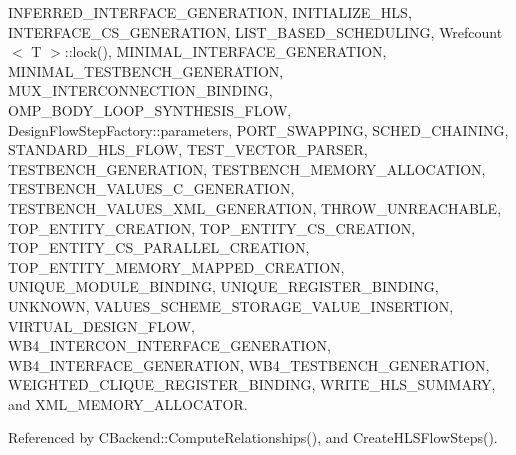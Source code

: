 I\+N\+F\+E\+R\+R\+E\+D\+\_\+\+I\+N\+T\+E\+R\+F\+A\+C\+E\+\_\+\+G\+E\+N\+E\+R\+A\+T\+I\+ON, I\+N\+I\+T\+I\+A\+L\+I\+Z\+E\+\_\+\+H\+LS, I\+N\+T\+E\+R\+F\+A\+C\+E\+\_\+\+C\+S\+\_\+\+G\+E\+N\+E\+R\+A\+T\+I\+ON, L\+I\+S\+T\+\_\+\+B\+A\+S\+E\+D\+\_\+\+S\+C\+H\+E\+D\+U\+L\+I\+NG, Wrefcount$<$ T $>$\+::lock(), M\+I\+N\+I\+M\+A\+L\+\_\+\+I\+N\+T\+E\+R\+F\+A\+C\+E\+\_\+\+G\+E\+N\+E\+R\+A\+T\+I\+ON, M\+I\+N\+I\+M\+A\+L\+\_\+\+T\+E\+S\+T\+B\+E\+N\+C\+H\+\_\+\+G\+E\+N\+E\+R\+A\+T\+I\+ON, M\+U\+X\+\_\+\+I\+N\+T\+E\+R\+C\+O\+N\+N\+E\+C\+T\+I\+O\+N\+\_\+\+B\+I\+N\+D\+I\+NG, O\+M\+P\+\_\+\+B\+O\+D\+Y\+\_\+\+L\+O\+O\+P\+\_\+\+S\+Y\+N\+T\+H\+E\+S\+I\+S\+\_\+\+F\+L\+OW, Design\+Flow\+Step\+Factory\+::parameters, P\+O\+R\+T\+\_\+\+S\+W\+A\+P\+P\+I\+NG, S\+C\+H\+E\+D\+\_\+\+C\+H\+A\+I\+N\+I\+NG, S\+T\+A\+N\+D\+A\+R\+D\+\_\+\+H\+L\+S\+\_\+\+F\+L\+OW, T\+E\+S\+T\+\_\+\+V\+E\+C\+T\+O\+R\+\_\+\+P\+A\+R\+S\+ER, T\+E\+S\+T\+B\+E\+N\+C\+H\+\_\+\+G\+E\+N\+E\+R\+A\+T\+I\+ON, T\+E\+S\+T\+B\+E\+N\+C\+H\+\_\+\+M\+E\+M\+O\+R\+Y\+\_\+\+A\+L\+L\+O\+C\+A\+T\+I\+ON, T\+E\+S\+T\+B\+E\+N\+C\+H\+\_\+\+V\+A\+L\+U\+E\+S\+\_\+\+C\+\_\+\+G\+E\+N\+E\+R\+A\+T\+I\+ON, T\+E\+S\+T\+B\+E\+N\+C\+H\+\_\+\+V\+A\+L\+U\+E\+S\+\_\+\+X\+M\+L\+\_\+\+G\+E\+N\+E\+R\+A\+T\+I\+ON, T\+H\+R\+O\+W\+\_\+\+U\+N\+R\+E\+A\+C\+H\+A\+B\+LE, T\+O\+P\+\_\+\+E\+N\+T\+I\+T\+Y\+\_\+\+C\+R\+E\+A\+T\+I\+ON, T\+O\+P\+\_\+\+E\+N\+T\+I\+T\+Y\+\_\+\+C\+S\+\_\+\+C\+R\+E\+A\+T\+I\+ON, T\+O\+P\+\_\+\+E\+N\+T\+I\+T\+Y\+\_\+\+C\+S\+\_\+\+P\+A\+R\+A\+L\+L\+E\+L\+\_\+\+C\+R\+E\+A\+T\+I\+ON, T\+O\+P\+\_\+\+E\+N\+T\+I\+T\+Y\+\_\+\+M\+E\+M\+O\+R\+Y\+\_\+\+M\+A\+P\+P\+E\+D\+\_\+\+C\+R\+E\+A\+T\+I\+ON, U\+N\+I\+Q\+U\+E\+\_\+\+M\+O\+D\+U\+L\+E\+\_\+\+B\+I\+N\+D\+I\+NG, U\+N\+I\+Q\+U\+E\+\_\+\+R\+E\+G\+I\+S\+T\+E\+R\+\_\+\+B\+I\+N\+D\+I\+NG, U\+N\+K\+N\+O\+WN, V\+A\+L\+U\+E\+S\+\_\+\+S\+C\+H\+E\+M\+E\+\_\+\+S\+T\+O\+R\+A\+G\+E\+\_\+\+V\+A\+L\+U\+E\+\_\+\+I\+N\+S\+E\+R\+T\+I\+ON, V\+I\+R\+T\+U\+A\+L\+\_\+\+D\+E\+S\+I\+G\+N\+\_\+\+F\+L\+OW, W\+B4\+\_\+\+I\+N\+T\+E\+R\+C\+O\+N\+\_\+\+I\+N\+T\+E\+R\+F\+A\+C\+E\+\_\+\+G\+E\+N\+E\+R\+A\+T\+I\+ON, W\+B4\+\_\+\+I\+N\+T\+E\+R\+F\+A\+C\+E\+\_\+\+G\+E\+N\+E\+R\+A\+T\+I\+ON, W\+B4\+\_\+\+T\+E\+S\+T\+B\+E\+N\+C\+H\+\_\+\+G\+E\+N\+E\+R\+A\+T\+I\+ON, W\+E\+I\+G\+H\+T\+E\+D\+\_\+\+C\+L\+I\+Q\+U\+E\+\_\+\+R\+E\+G\+I\+S\+T\+E\+R\+\_\+\+B\+I\+N\+D\+I\+NG, W\+R\+I\+T\+E\+\_\+\+H\+L\+S\+\_\+\+S\+U\+M\+M\+A\+RY, and X\+M\+L\+\_\+\+M\+E\+M\+O\+R\+Y\+\_\+\+A\+L\+L\+O\+C\+A\+T\+OR.



Referenced by C\+Backend\+::\+Compute\+Relationships(), and Create\+H\+L\+S\+Flow\+Steps().

